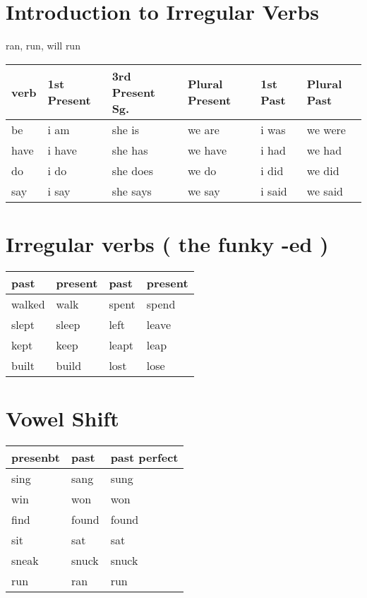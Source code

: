 \documentclass[11pt]{article}
\begin{document}
\section{Introduction to Irregular Verbs}
\label{sec:org11894c5}
ran, run, will run
\begin{center}
\begin{tabular}{llllll}
verb & 1st Present & 3rd Present Sg. & Plural Present & 1st Past & Plural Past\\
\hline
be & i am & she is & we are & i was & we were\\
have & i have & she has & we have & i had & we had\\
do & i do & she does & we do & i did & we did\\
say & i say & she says & we say & i said & we said\\
\end{tabular}
\end{center}

\section{Irregular verbs ( the funky -ed )}
\label{sec:org6ba3134}
\begin{center}
\begin{tabular}{llll}
past & present & past & present\\
\hline
walked & walk & spent & spend\\
slept & sleep & left & leave\\
kept & keep & leapt & leap\\
built & build & lost & lose\\
\end{tabular}
\end{center}

\section{Vowel Shift}
\label{sec:org3ee2c72}
\begin{center}
\begin{tabular}{lll}
presenbt & past & past perfect\\
\hline
sing & sang & sung\\
win & won & won\\
find & found & found\\
sit & sat & sat\\
sneak & snuck & snuck\\
run & ran & run\\
\end{tabular}
\end{center}
\end{document}
